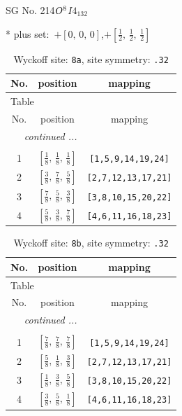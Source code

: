 \documentclass[fleqn,8pt]{jsarticle}
\begin{document}
\setcounter{MaxMatrixCols}{32}

\renewcommand{\tablename}{Table~}
\renewcommand{\figurename}{Figure~}
\begin{center}
\LARGE
SG No. 214\quad$O_{\rm }^{8}$\quad$I4_132$\quad[ cubic ]
\end{center}
* plus set:\,\,\,$+\left[ 0,\, 0,\, 0 \right]$,\quad $+\left[ \frac{1}{2},\, \frac{1}{2},\, \frac{1}{2} \right]$
\renewcommand{\arraystretch}{1.2}
\begin{longtable}{ccc}
\caption{Wyckoff site: {\tt 8a}, site symmetry: {\tt .32}}
 \\
 \hline \hline
No. & position & mapping \\ \hline \endfirsthead

\multicolumn{2}{l}{\tablename\ \thetable{}} \\
 \hline \hline
No. & position & mapping \\ \hline \endhead

 \hline \hline
\multicolumn{2}{r}{\footnotesize\it continued ...} \\ \endfoot

 \hline \hline
\multicolumn{2}{r}{} \\ \endlastfoot

1 & $\left[ \frac{1}{8},\, \frac{1}{8},\, \frac{1}{8} \right]$ & {\tt [1,5,9,14,19,24]} \\ \hline
2 & $\left[ \frac{3}{8},\, \frac{7}{8},\, \frac{5}{8} \right]$ & {\tt [2,7,12,13,17,21]} \\ \hline
3 & $\left[ \frac{7}{8},\, \frac{5}{8},\, \frac{3}{8} \right]$ & {\tt [3,8,10,15,20,22]} \\ \hline
4 & $\left[ \frac{5}{8},\, \frac{3}{8},\, \frac{7}{8} \right]$ & {\tt [4,6,11,16,18,23]} \\
\end{longtable}
\renewcommand{\arraystretch}{1.2}
\begin{longtable}{ccc}
\caption{Wyckoff site: {\tt 8b}, site symmetry: {\tt .32}}
 \\
 \hline \hline
No. & position & mapping \\ \hline \endfirsthead

\multicolumn{2}{l}{\tablename\ \thetable{}} \\
 \hline \hline
No. & position & mapping \\ \hline \endhead

 \hline \hline
\multicolumn{2}{r}{\footnotesize\it continued ...} \\ \endfoot

 \hline \hline
\multicolumn{2}{r}{} \\ \endlastfoot

1 & $\left[ \frac{7}{8},\, \frac{7}{8},\, \frac{7}{8} \right]$ & {\tt [1,5,9,14,19,24]} \\ \hline
2 & $\left[ \frac{5}{8},\, \frac{1}{8},\, \frac{3}{8} \right]$ & {\tt [2,7,12,13,17,21]} \\ \hline
3 & $\left[ \frac{1}{8},\, \frac{3}{8},\, \frac{5}{8} \right]$ & {\tt [3,8,10,15,20,22]} \\ \hline
4 & $\left[ \frac{3}{8},\, \frac{5}{8},\, \frac{1}{8} \right]$ & {\tt [4,6,11,16,18,23]} \\
\end{longtable}
\end{document}
